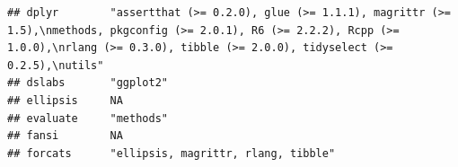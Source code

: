 \documentclass[]{article}
\begin{document}
\begin{verbatim}
## dplyr        "assertthat (>= 0.2.0), glue (>= 1.1.1), magrittr (>= 1.5),\nmethods, pkgconfig (>= 2.0.1), R6 (>= 2.2.2), Rcpp (>= 1.0.0),\nrlang (>= 0.3.0), tibble (>= 2.0.0), tidyselect (>= 0.2.5),\nutils"                                                                                                                                                                                                                                                                                      
## dslabs       "ggplot2"                                                                                                                                                                                                                                                                                                                                                                                                                                                                             
## ellipsis     NA                                                                                                                                                                                                                                                                                                                                                                                                                                                                                    
## evaluate     "methods"                                                                                                                                                                                                                                                                                                                                                                                                                                                                             
## fansi        NA                                                                                                                                                                                                                                                                                                                                                                                                                                                                                    
## forcats      "ellipsis, magrittr, rlang, tibble"                                                                                                                                                                                                                                                                                                                                                                                                                                                   

\end{verbatim}
\end{document}
